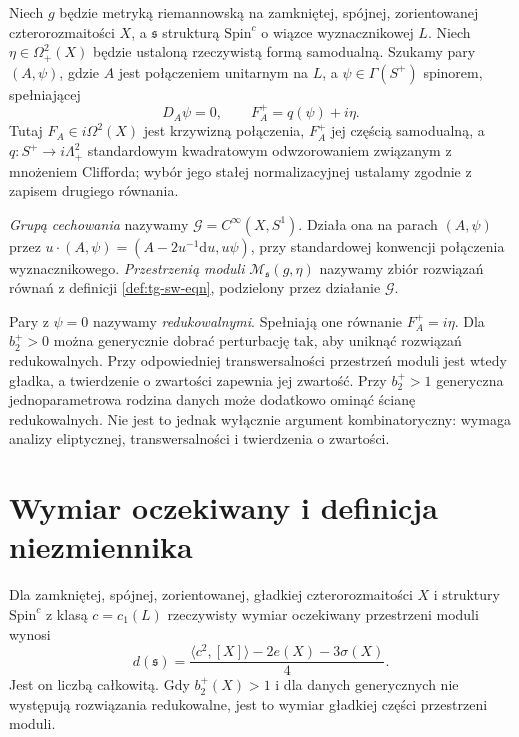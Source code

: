 \begin{definicja}
\label{def:tg-sw-eqn}
Niech $g$ będzie metryką riemannowską na zamkniętej,
spójnej, zorientowanej czterorozmaitości $X$, a
$\mathfrak s$ strukturą $\mathrm{Spin}^c$ o wiązce
wyznacznikowej $L$. Niech $\eta\in\Omega^2_+(X)$
będzie ustaloną rzeczywistą formą samodualną.
Szukamy pary $(A,\psi)$, gdzie $A$ jest połączeniem
unitarnym na $L$, a $\psi\in\Gamma(S^+)$ spinorem,
spełniającej
\[
D_A\psi=0,\qquad F_A^+=q(\psi)+i\eta.
\]
Tutaj $F_A\in i\Omega^2(X)$ jest krzywizną połączenia,
$F_A^+$ jej częścią samodualną, a
$q:S^+\to i\Lambda^2_+$ standardowym kwadratowym
odwzorowaniem związanym z mnożeniem Clifforda;
wybór jego stałej normalizacyjnej ustalamy zgodnie
z zapisem drugiego równania.
\end{definicja}

\begin{definicja}
\emph{Grupą cechowania} nazywamy
$\mathcal G=C^\infty(X,S^1)$.
Działa ona na parach $(A,\psi)$ przez
$u\cdot(A,\psi)=(A-2u^{-1}\mathrm du,u\psi)$,
przy standardowej konwencji połączenia wyznacznikowego.
\emph{Przestrzenią moduli} $\mathcal M_{\mathfrak s}(g,\eta)$
nazywamy zbiór rozwiązań równań z definicji
\ref{def:tg-sw-eqn}, podzielony przez działanie $\mathcal G$.
\end{definicja}

\begin{uwaga}
Pary z $\psi=0$ nazywamy \emph{redukowalnymi}.
Spełniają one równanie $F_A^+=i\eta$.
Dla $b_2^+>0$ można generycznie dobrać perturbację
tak, aby uniknąć rozwiązań redukowalnych. Przy odpowiedniej
transwersalności przestrzeń moduli jest wtedy gładka,
a twierdzenie o zwartości zapewnia jej zwartość.
Przy $b_2^+>1$ generyczna jednoparametrowa rodzina danych
może dodatkowo ominąć ścianę redukowalnych. Nie jest to jednak wyłącznie argument
kombinatoryczny: wymaga analizy eliptycznej, transwersalności
i twierdzenia o zwartości.
\end{uwaga}

\section{Wymiar oczekiwany i definicja niezmiennika}
\label{sec:tg-sw-dimension}

\begin{twierdzenie}
\label{thm:tg-sw-dimension}
Dla zamkniętej, spójnej, zorientowanej,
gładkiej czterorozmaitości $X$ i struktury
$\mathrm{Spin}^c$ z klasą $c=c_1(L)$ rzeczywisty
wymiar oczekiwany przestrzeni moduli wynosi
\[
d(\mathfrak s)=\frac{\langle c^2,[X]\rangle-2e(X)-3\sigma(X)}4.
\]
Jest on liczbą całkowitą. Gdy $b_2^+(X)>1$ i dla danych
generycznych nie występują rozwiązania redukowalne,
jest to wymiar gładkiej części przestrzeni moduli.
\end{twierdzenie}

